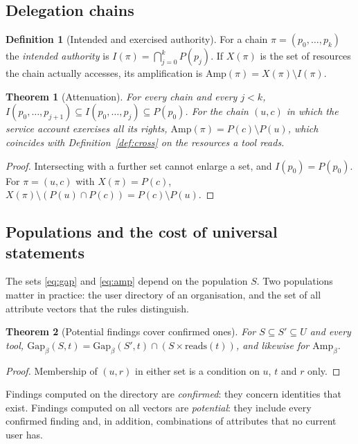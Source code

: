 \documentclass[preprint,12pt]{elsarticle}
\newtheorem{theorem}{Theorem}
\theoremstyle{definition}
\newtheorem{definition}{Definition}
\theoremstyle{remark}
\newcommand{\reads}{\mathrm{reads}}
\newcommand{\Gap}{\mathrm{Gap}}
\newcommand{\Amp}{\mathrm{Amp}}
\begin{document}
\subsection{Delegation chains}
\begin{definition}[Intended and exercised authority]\label{def:chain}
For a chain $\pi = (p_0, \dots, p_k)$ the \emph{intended authority} is $I(\pi) = \bigcap_{j=0}^{k} P(p_j)$. If $X(\pi)$ is the set of resources the chain actually accesses, its amplification is $\Amp(\pi) = X(\pi) \setminus I(\pi)$.
\end{definition}
\begin{theorem}[Attenuation]\label{thm:chain}
For every chain and every $j < k$, $I(p_0, \dots, p_{j+1}) \subseteq I(p_0, \dots, p_j) \subseteq P(p_0)$. For the chain $(u, c)$ in which the service account exercises all its rights, $\Amp(\pi) = P(c) \setminus P(u)$, which coincides with Definition~\ref{def:cross} on the resources a tool reads.
\end{theorem}
\begin{proof}
Intersecting with a further set cannot enlarge a set, and $I(p_0) = P(p_0)$. For $\pi = (u, c)$ with $X(\pi) = P(c)$, $X(\pi) \setminus (P(u) \cap P(c)) = P(c) \setminus P(u)$.
\end{proof}

\subsection{Populations and the cost of universal statements}
The sets \eqref{eq:gap} and \eqref{eq:amp} depend on the population $S$. Two populations matter in practice: the user directory of an organisation, and the set of all attribute vectors that the rules distinguish.

\begin{theorem}[Potential findings cover confirmed ones]\label{thm:potential}
For $S \subseteq S' \subseteq U$ and every tool, $\Gap_\beta(S, t) = \Gap_\beta(S', t) \cap (S \times \reads(t))$, and likewise for $\Amp_\beta$.
\end{theorem}
\begin{proof}
Membership of $(u, r)$ in either set is a condition on $u$, $t$ and $r$ only.
\end{proof}
Findings computed on the directory are \emph{confirmed}: they concern identities that exist. Findings computed on all vectors are \emph{potential}: they include every confirmed finding and, in addition, combinations of attributes that no current user has.
\end{document}
